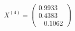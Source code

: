 \documentclass[preview]{standalone}
\begin{document}
\begin{align*}
X^{(4)} = \begin{pmatrix} 0.9933 \\ 0.4383 \\ -0.1062 \end{pmatrix}
\end{align*}
\end{document}
